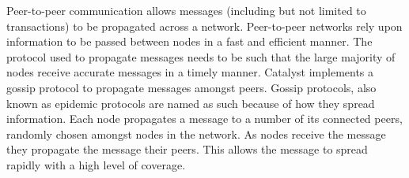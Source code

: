 Peer-to-peer communication allows messages (including but not limited to transactions) to be propagated across a network. Peer-to-peer networks rely upon information to be passed between nodes in a fast and efficient manner. The protocol used to propagate messages needs to be such that the large majority of nodes receive accurate messages in a timely manner. Catalyst implements a gossip protocol to propagate messages amongst peers. Gossip protocols, also known as epidemic protocols are named as such because of how they spread information. Each node propagates a message to a number of its connected peers, randomly chosen amongst nodes in the network. As nodes receive the message they propagate the message their peers. This allows the message to spread rapidly with a high level of coverage. 

